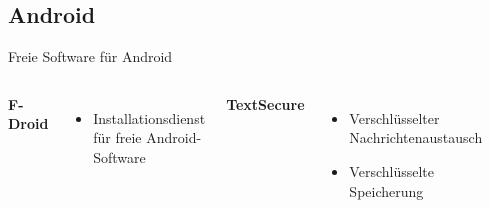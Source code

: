 \documentclass[12pt]{beamer}
\begin{document}
\subsection{Android}
\begin{frame}{Freie Software für Android}

\begin{columns}


\column{6cm}


\textbf{F-Droid}
\begin{itemize}
\item Installationsdienst für freie Android-Software
\end{itemize}

\vspace{0.5cm}



\textbf{TextSecure}
\begin{itemize}
\item Verschlüsselter Nachrichtenaustausch
\item Verschlüsselte Speicherung
\end{itemize}

\column{5cm}


\begin{center}
\includegraphics[width=2cm]{img/F-Droid_Logo_2}
\par\end{center}


\begin{center}
\includegraphics[width=2cm]{img/TextSecure_Icon}
\par\end{center}

\end{columns}
\end{frame}
\end{document}
